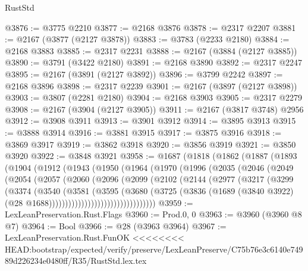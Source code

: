 \begin{lexlean}{RustStd}
\begin{coremodule}
{\begin{coremodule}
{{{{{{{{{{{{{{{{@3876 := @3775 @2210
@3877 := @2168 @3876
@3878 := @2317 @2207
@3881 := @2167 (@3877 (@2127 @3878))
@3883 := @3783 (@2233 @2180)
@3884 := @2168 @3883
@3885 := @2317 @2231
@3888 := @2167 (@3884 (@2127 @3885))
@3890 := @3791 (@3422 @2180)
@3891 := @2168 @3890
@3892 := @2317 @2247
@3895 := @2167 (@3891 (@2127 @3892))
@3896 := @3799 @2242
@3897 := @2168 @3896
@3898 := @2317 @2239
@3901 := @2167 (@3897 (@2127 @3898))
@3903 := @3807 (@2281 @2180)
@3904 := @2168 @3903
@3905 := @2317 @2279
@3908 := @2167 (@3904 (@2127 @3905))
@3911 := @2167 (@3817 @3748) @2956
@3912 := @3908 @3911
@3913 := @3901 @3912
@3914 := @3895 @3913
@3915 := @3888 @3914
@3916 := @3881 @3915
@3917 := @3875 @3916
@3918 := @3869 @3917
@3919 := @3862 @3918
@3920 := @3856 @3919
@3921 := @3850 @3920
@3922 := @3848 @3921
@3958 := @1687
    (@1818
      (@1862
        (@1887
          (@1893
            (@1904
              (@1912
                (@1943
                  (@1950
                    (@1964
                      (@1970
                        (@1996
                          (@2035
                            (@2046
                              (@2049
                                (@2054
                                  (@2057
                                    (@2060
                                      (@2096
                                        (@2099
                                          (@2102
                                            (@2144
                                              (@2977
                                                (@3217
                                                  (@3299
                                                    (@3374
                                                      (@3540
                                                        (@3581
                                                          (@3595
                                                            (@3680
                                                              (@3725
                                                                (@3836
                                                                  (@1689
                                                                    (@3840 @3922)
                                                                    (@28
                                                                      @1688)))))))))))))))))))))))))))))))))
@3959 := LexLeanPreservation.Rust.Flags
@3960 := Prod.{0, 0}
@3963 := @3960 (@3960 @8 @7)
@3964 := Bool
@3966 := @28 (@3963 @3964)
@3967 := LexLeanPreservation.Rust.FunOK
<<<<<<<< HEAD:bootstrap/expected/verify/preserve/LexLeanPreserve/C75b76e3c6140e74989d226234e0480ff/R35/RustStd.lex.tex
}}}}}}}}}}}}}}}}
\end{coremodule}}
\end{coremodule}
\end{lexlean}

